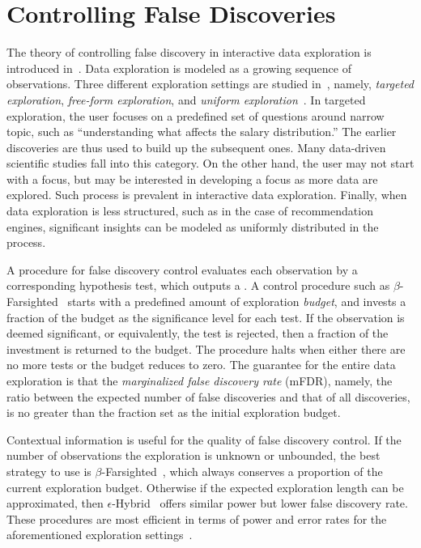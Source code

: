 \section{Controlling False Discoveries}
\label{sec:theory}

The theory of controlling false discovery in interactive data exploration is introduced in~\cite{zhao2016controlling}. 
Data exploration is modeled as a growing sequence of observations.  Three different exploration settings are studied in~\cite{zhao2016controlling}, namely, \textit{targeted exploration}, \textit{free-form exploration}, and \textit{uniform exploration}~\cite{zhao2016controlling}.  In targeted exploration, the user focuses on a predefined set of questions around narrow topic, such as ``understanding what affects the salary distribution.''  The earlier discoveries are thus used to build up the subsequent ones.  Many data-driven scientific studies fall into this category.  On the other hand, the user may not start with a focus, but may be interested in developing a focus as more data are explored.  Such process is prevalent in interactive data exploration.  Finally, when data exploration is less structured, such as in the case of recommendation engines, significant insights can be modeled as uniformly distributed in the process.

A procedure for false discovery control evaluates each observation by a corresponding hypothesis test, which outputs a \pval{}. A control procedure such as $\beta$-Farsighted~\cite{zhao2016controlling} starts with a predefined amount of exploration \textit{budget}, and invests a fraction of the budget as the significance level for each test.  If the observation is deemed significant, or equivalently, the test is rejected, then a fraction of the investment is returned to the budget. The procedure halts when either there are no more tests or the budget reduces to zero.  The guarantee for the entire data exploration is that the \textit{marginalized false discovery rate} (mFDR), namely, the ratio between the expected number of false discoveries and that of all discoveries, is no greater than the fraction set as the initial exploration budget.

Contextual information is useful for the quality of false discovery control. If the number of observations the exploration is unknown or unbounded, the best strategy to use is $\beta$-Farsighted~\cite{zhao2016controlling}, which always conserves a proportion of the current exploration budget.  Otherwise if the expected exploration length can be approximated, then $\epsilon$-Hybrid~\cite{zhao2016controlling} offers similar power but lower false discovery rate.  These procedures are most efficient in terms of power and error rates for the aforementioned exploration settings~\cite{zhao2016controlling}.

